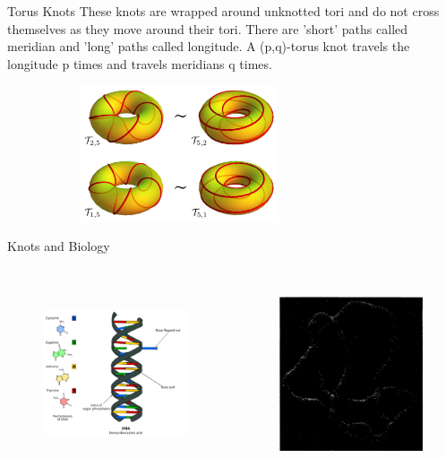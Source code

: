 \begin{frame}{Torus Knots}
	These knots are wrapped around unknotted tori and do not cross themselves as they move around their tori. There are 'short' paths called meridian and 'long' paths called longitude. A (p,q)-torus knot travels the longitude p times and travels meridians q times.
	\begin{figure}
		\centering
		\includegraphics[height= 4cm, width=8cm]{images/torus.png}
		\label{torus}
		
	\end{figure}
	\cite{article}    
\end{frame}
\begin{frame}{Knots and Biology}
	\begin{columns}[T]
		\begin{column}{.48\textwidth}
			\cite{555w}
			\begin{figure}
				\centering
				\includegraphics[width= 6cm,height=5.5cm]{images/dnastring.png}
				\label{dnast}
			\end{figure}
		\end{column}
		\begin{column}{.48\textwidth}
			\cite{adams2004knot}
			\begin{figure}[h]
				\centering
				\includegraphics[width= 6cm,height=5.5cm]{images/electron.png}
				\label{elec}
			\end{figure}
		\end{column}
	\end{columns}
\end{frame}
